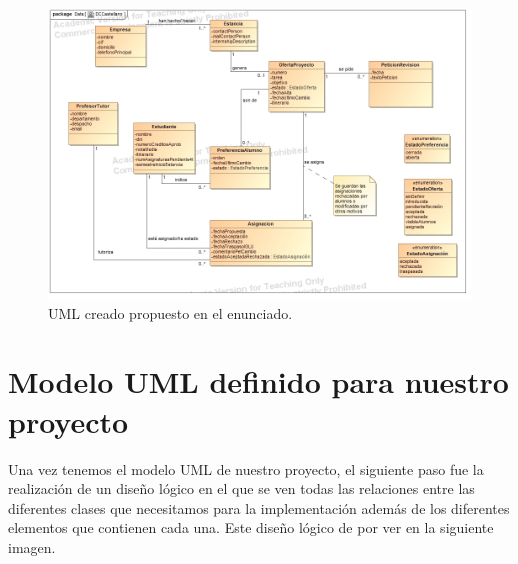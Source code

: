 \documentclass[pdftex,11pt,a4paper]{book}
\begin{document}
\begin{figure}[h]
\begin{center}
\includegraphics[width=\textwidth]{img/uml_enunciado.jpg}
\caption{\label{uml_propio} UML creado propuesto en el enunciado.}
\end{center}
\end{figure}

\section{Modelo UML definido para nuestro proyecto}
Una vez tenemos el modelo UML de nuestro proyecto, el siguiente paso fue la
realización de un diseño lógico en el que se ven todas las relaciones entre las diferentes clases que necesitamos para la implementación además de los diferentes elementos que contienen cada una. Este diseño lógico de por ver en la siguiente imagen.
\end{document}
